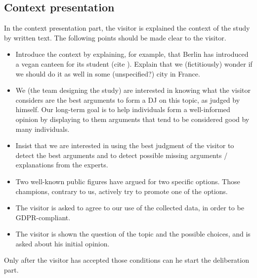 \documentclass[version=3.21, pagesize, twoside=off, bibliography=totoc, DIV=calc, fontsize=12pt, a4paper]{scrartcl}
\begin{document}
\subsection{Context presentation}
In the context presentation part, the visitor is explained the context of the study by written text. The following points should be made clear to the visitor.
\begin{itemize}
	\item Introduce the context by explaining, for example, that Berlin has introduced a vegan canteen for its student (cite ). Explain that we (fictitiously) wonder if we should do it as well in some (unspecified?) city in France.
	\item We (the team designing the study) are interested in knowing what the visitor considers are the best arguments to form a \ac{DJ} on this topic, as judged by himself. Our long-term goal is to help individuals form a well-informed opinion by displaying to them arguments that tend to be considered good by many individuals.
	\item Insist that we are interested in using the best judgment of the visitor to detect the best arguments and to detect possible missing arguments / explanations from the experts.
	\item Two well-known public figures have argued for two specific options. Those champions, contrary to us, actively try to promote one of the options.
	\item The visitor is asked to agree to our use of the collected data, in order to be GDPR-compliant.
	\item The visitor is shown the question of the topic and the possible choices, and is asked about his initial opinion.
\end{itemize}
Only after the visitor has accepted those conditions can he start the deliberation part. 
\end{document}
